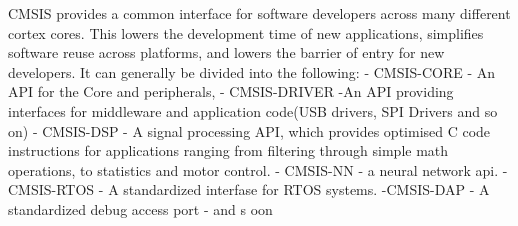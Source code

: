 \sol CMSIS provides a common interface for software developers across many different cortex cores. This lowers the development time of
     new applications, simplifies software reuse across platforms, and lowers the barrier of entry for new developers.
     It can generally be divided into the following:\newline
     - CMSIS-CORE - An API for the Core and peripherals,
     - CMSIS-DRIVER -An API providing interfaces for middleware and application code(USB drivers, SPI Drivers and so on)
     - CMSIS-DSP - A signal processing API, which provides optimised C code instructions for applications ranging from filtering
                   through simple math operations, to statistics and motor control.
     - CMSIS-NN - a neural network api.
     - CMSIS-RTOS - A standardized interfase for RTOS systems.
     -CMSIS-DAP - A standardized debug access port
     - and s oon


 \qs{}{}
